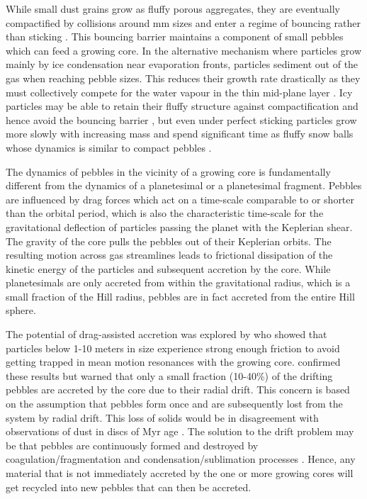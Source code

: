 While small dust grains grow as fluffy porous aggregates, they are eventually compactified by collisions around
mm sizes and enter a regime of bouncing rather than sticking \citep{Zsom2010}. This bouncing barrier maintains
a component of small pebbles which can feed a growing core. In the alternative mechanism where particles grow
mainly by ice condensation near evaporation fronts, particles sediment out of the gas when reaching pebble sizes.
This reduces their growth rate drastically as they must collectively compete for the water vapour in the thin mid-plane 
layer \citep{Ros2013}. Icy particles may be able to retain their fluffy structure against compactification
and hence avoid the bouncing barrier \citep{Wada2009}, but even under perfect sticking particles grow more slowly
with increasing mass and spend significant time as fluffy snow balls whose dynamics is similar to compact pebbles
\citep{Okuzumi2012}.

The dynamics of pebbles in the vicinity of a growing core is fundamentally different from the dynamics of a planetesimal 
or a planetesimal fragment. Pebbles are influenced by drag forces which act on a time-scale comparable to or
shorter than the orbital period, which is also the characteristic time-scale for the gravitational deflection of particles
passing the planet with the Keplerian shear. The gravity of the core pulls the pebbles out of their Keplerian orbits.
The resulting motion across gas streamlines leads to frictional dissipation of the kinetic energy of the particles and
subsequent accretion by the core. While planetesimals are only accreted from within the gravitational radius, which is
a small fraction of the Hill radius, pebbles are in fact accreted from the entire Hill sphere.

The potential of drag-assisted accretion was explored by \cite{Weidenschilling1985} who showed that particles 
below 1-10 meters in size experience strong enough friction to avoid getting trapped in mean motion resonances
with the growing core. \cite{Kary1993} confirmed these results but warned that only a small fraction (10-40\%) of the
drifting pebbles are accreted by the core due to their radial drift. This concern is based on the assumption that 
pebbles form once and are subsequently lost from the system by radial drift. This loss of solids would be in disagreement 
with observations of dust in discs of Myr age \citep{Brauer2007}. The solution to the drift problem may be that
pebbles are continuously formed and destroyed by coagulation/fragmentation and condensation/sublimation processes
\citep{Birnstiel2010, Ros2013}. Hence, any material that is not immediately accreted by the one or
more growing cores will get recycled into new pebbles that can then be accreted.

